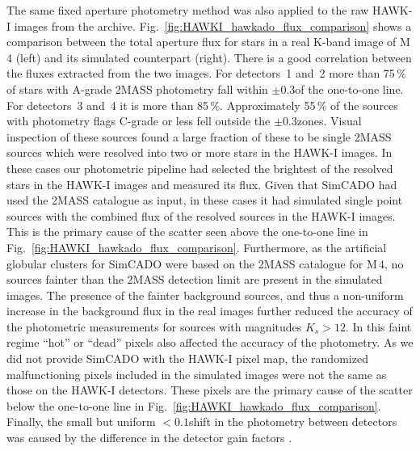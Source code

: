 The same fixed aperture photometry method was also applied to the raw HAWK-I images from the archive.
Fig.~\ref{fig:HAWKI_hawkado_flux_comparison} shows a comparison between the total aperture flux for stars in a real K-band image of M\,4 (left) and its simulated counterpart (right).
There is a good correlation between the fluxes extracted from the two images.
For detectors~1 and~2 more than 75\,\% of stars with A-grade 2MASS photometry fall within $\pm0.3$\m of the one-to-one line.
For detectors~3 and~4 it is more than 85\,\%. Approximately 55\,\% of the sources with photometry flags C-grade or less fell outside the $\pm0.3$\m zones.
Visual inspection of these sources found a large fraction of these to be single 2MASS sources which were resolved into two or more stars in the HAWK-I images.
In these cases our photometric pipeline had selected the brightest of the resolved stars in the HAWK-I images and measured its flux.
Given that SimCADO had used the 2MASS catalogue as input, in these cases it had simulated single point sources with the combined flux of the resolved sources in the HAWK-I images.
This is the primary cause of the scatter seen above the one-to-one line in Fig.~\ref{fig:HAWKI_hawkado_flux_comparison}.
Furthermore, as the artificial globular clusters for SimCADO were based on the 2MASS catalogue for M\,4, no sources fainter than the 2MASS detection limit are present in the simulated images.
The presence of the fainter background sources, and thus a non-uniform increase in the background flux in the real images further reduced the accuracy of the photometric measurements for sources with magnitudes $K_{s} > 12$\m.
In this faint regime ``hot'' or ``dead'' pixels also affected the accuracy of the photometry.
As we did not provide SimCADO with the HAWK-I pixel map, the randomized malfunctioning pixels included in the simulated images were not the same as those on the HAWK-I detectors.
These pixels are the primary cause of the scatter below the one-to-one line in Fig.~\ref{fig:HAWKI_hawkado_flux_comparison}.
Finally, the small but uniform $< 0.1$\m shift in the photometry between detectors was caused by the difference in the detector gain factors \citep{hawki}.

